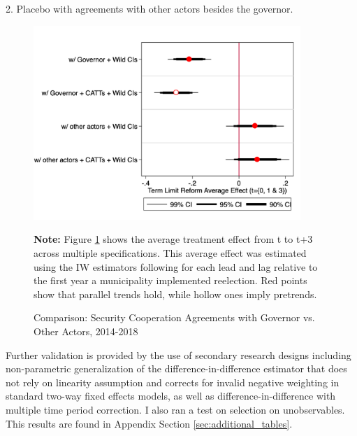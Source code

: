 \documentclass[12pt]{amsart}
\makeatletter
\def\section{\@startsection{section}{1}
	\z@{1.0\linespacing\@plus\linespacing}{.5\linespacing}{\Large}}
\numberwithin{equation}{section}
\theoremstyle{definition}
\theoremstyle{definition}
\theoremstyle{definition}
\makeatother
\begin{document}
2. Placebo with agreements with other actors besides the governor. 

 \begin{figure}[H]   
\centering
 \caption{Comparison: Security Cooperation Agreements with Governor vs. Other Actors, 2014-2018}
 \label{fig:comparison_fed_estatal}
\includegraphics[width=0.9\textwidth]{../Figures/average_effects_comparisonfedest.png}
       \captionsetup{justification=centering}
       
 \textbf{Note:} Figure \ref{fig:comparison_fed_estatal} shows the average treatment effect from t to t+3 across multiple specifications. This average effect was estimated using the IW estimators following \citet{abraham_sun_2020} for each lead and lag relative to the first year a municipality implemented reelection. Red points show that parallel trends hold, while hollow ones imply pretrends. 
\end{figure}   

Further validation is provided by the use of secondary research designs including \citet{imai_etal_2020} non-parametric generalization of the difference-in-difference estimator that does not rely on linearity assumption and corrects for invalid negative weighting in standard two-way fixed effects models, as well as \citet{chaisemarting_etal_2019} difference-in-difference with multiple time period correction. I also ran a test on selection on unobservables. This results are found in Appendix Section \ref{sec:additional_tables}.



\clearpage 



\section{Mechanisms}
\end{document}
